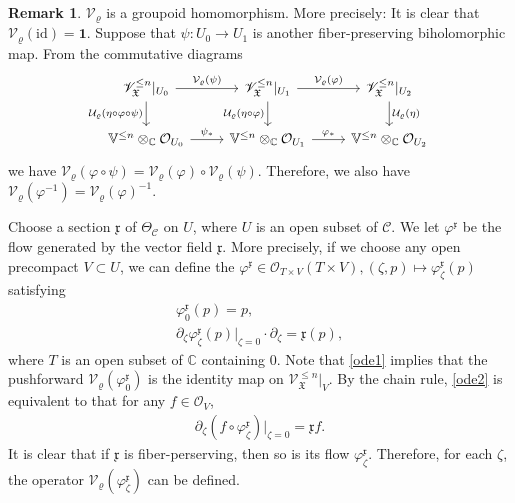 \documentclass[11pt,b5paper,notitlepage]{article}
\theoremstyle{definition}
\newtheorem{rem}[df]{Remark}
\theoremstyle{plain}
\newcommand{\fk}{\mathfrak}
\newcommand{\mc}{\mathcal}
\newcommand{\idt}{\mathbf{1}}
\newcommand{\SV}{\mathscr{V}}
\newcommand{\scr}{\mathscr}
\newcommand{\xk}{\mathfrak x}
\newcommand{\Vbb}{\mathbb V}
\newcommand{\Cbb}{\mathbb C}
\newcommand{\<}{\left\langle}
\renewcommand{\>}{\right\rangle}
\newcommand{\MO}{\mathcal{O}}
\newcommand{\MC}{\mathcal{C}}
\newcommand{\fx}{\mathfrak{X}}
\newcommand{\MV}{\mathcal{V}}
\newcommand{\id}{\mathrm{id}}
\numberwithin{equation}{subsection}
\begin{document}
\begin{rem}\label{mc1}
$\mc V_\varrho$ is a groupoid homomorphism. More precisely: It is clear that $\mc V_\varrho(\id)=\idt$.  Suppose that $\psi:U_0\rightarrow U_1$ is another fiber-preserving biholomorphic map. From the commutative diagrams
\begin{equation*}
\begin{tikzcd}
\scr V_{\fk X}^{\leq n}|_{U_0}\arrow[r,"\mc V_\varrho(\psi)"] \arrow[d,"\mc U_\varrho(\eta\circ\varphi\circ\psi)"']&\scr V_{\fk X}^{\leq n}|_{U_1} \arrow[r,"\mc V_\varrho(\varphi)"] \arrow[d,"\mc U_\varrho(\eta\circ\varphi)"'] & \scr V_\fx^{\leq n}|_{U_2} \arrow[d,"\mc U_\varrho(\eta)"] \\
\Vbb^{\leq n}\otimes_\Cbb\mc O_{U_0}\arrow[r,"\psi_*"]&\Vbb^{\leq n}\otimes_\Cbb\mc O_{U_1} \arrow[r,"{\varphi_*}"]           & \Vbb^{\leq n}\otimes_\Cbb\mc O_{U_2}         
\end{tikzcd}
\end{equation*}
we have $\mc V_\varrho(\varphi\circ\psi)=\MV_\varrho(\varphi)\circ\MV_\varrho(\psi)$. Therefore, we also have $\MV_\varrho(\varphi^{-1})=\MV_\varrho(\varphi)^{-1}$.
\end{rem}



Choose a section $\xk$ of $\Theta_{\MC}$ on $U$, where $U$ is an open subset of $\MC$. We let $\varphi^\xk$ be the flow generated by the vector field $\xk$. More precisely, if we choose any open precompact $V\subset U$, we can define the $\varphi^\xk\in \MO_{T\times V}(T\times V),(\zeta,p)\mapsto \varphi_\zeta^\xk(p)$ satisfying
\begin{subequations}
    \begin{gather}
    \varphi_0^\xk(p)=p, \label{ode1} \\
    \partial_\zeta \varphi_\zeta^\xk(p)\vert_{\zeta=0}\cdot\partial_\zeta=\xk(p),\label{ode2}
\end{gather}
\end{subequations}
where $T$ is an open subset of $\Cbb$ containing 0. Note that \eqref{ode1} implies that the pushforward $\MV_\varrho(\varphi_0^\xk)$ is the identity map on $\SV_\fx^{\leq n}\vert_V$. By the chain rule, \eqref{ode2} is equivalent to that for any $f\in\MO_V$,
\begin{align}\label{eqb18}
    \partial_{\zeta}(f\circ \varphi_\zeta^\xk)\vert_{\zeta=0}=\xk f.
\end{align}
It is clear that if $\xk$ is fiber-perserving, then so is its flow $\varphi_\zeta^\xk$. Therefore, for each $\zeta$, the operator $\mc V_\varrho(\varphi_\zeta^\xk)$ can be defined.
\end{document}
